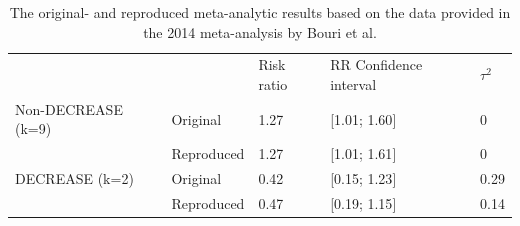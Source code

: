 \documentclass[]{article}
\begin{document}
\begin{longtable}[]{@{}lllll@{}}
\caption{The original- and reproduced meta-analytic results based on the
data provided in the 2014 meta-analysis by Bouri et al.}\tabularnewline
\toprule
\begin{minipage}[t]{0.19\columnwidth}\raggedright\strut
\strut
\end{minipage} & \begin{minipage}[t]{0.19\columnwidth}\raggedright\strut
\strut
\end{minipage} & \begin{minipage}[t]{0.19\columnwidth}\raggedright\strut
Risk ratio\strut
\end{minipage} & \begin{minipage}[t]{0.19\columnwidth}\raggedright\strut
RR Confidence interval\strut
\end{minipage} & \begin{minipage}[t]{0.19\columnwidth}\raggedright\strut
\(\tau^2\)\strut
\end{minipage}\tabularnewline
Non-DECREASE (k=9) & Original & 1.27 & {[}1.01; 1.60{]} &
0\tabularnewline
\begin{minipage}[t]{0.19\columnwidth}\raggedright\strut
\strut
\end{minipage} & \begin{minipage}[t]{0.19\columnwidth}\raggedright\strut
Reproduced\strut
\end{minipage} & \begin{minipage}[t]{0.19\columnwidth}\raggedright\strut
1.27\strut
\end{minipage} & \begin{minipage}[t]{0.19\columnwidth}\raggedright\strut
{[}1.01; 1.61{]}\strut
\end{minipage} & \begin{minipage}[t]{0.19\columnwidth}\raggedright\strut
0\strut
\end{minipage}\tabularnewline
DECREASE (k=2) & Original & 0.42 & {[}0.15; 1.23{]} &
0.29\tabularnewline
\begin{minipage}[t]{0.19\columnwidth}\raggedright\strut
\strut
\end{minipage} & \begin{minipage}[t]{0.19\columnwidth}\raggedright\strut
Reproduced\strut
\end{minipage} & \begin{minipage}[t]{0.19\columnwidth}\raggedright\strut
0.47\strut
\end{minipage} & \begin{minipage}[t]{0.19\columnwidth}\raggedright\strut
{[}0.19; 1.15{]}\strut
\end{minipage} & \begin{minipage}[t]{0.19\columnwidth}\raggedright\strut
0.14\strut
\end{minipage}\tabularnewline
\bottomrule
\end{longtable}
\end{document}
